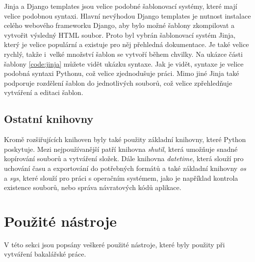 \documentclass[thesis=B,czech]{resources/FITthesis}[2012/06/26]
\begin{document}
Jinja a Django templates jsou velice podobné šablonovací systémy, které mají velice podobnou syntaxi. Hlavní nevýhodou Django templates je nutnost instalace celého webového frameworku Django, aby bylo možné šablony zkompilovat a vytvořit výsledný HTML soubor. Proto byl vybrán šablonovací systém Jinja, který je velice populární a existuje pro něj přehledná dokumentace. Je také velice rychlý, takže i~velké množství šablon se vytvoří během chvilky. Na ukázce části šablony \ref{code:jinja} můžete vidět ukázku syntaxe. Jak je vidět, syntaxe je velice podobná syntaxi Pythonu, což velice zjednodušuje práci. Mimo jiné Jinja také podporuje rozdělení šablon do jednotlivých souborů, což velice zpřehledňuje vytváření a editaci šablon.

\subsection{Ostatní knihovny}
Kromě rozšiřujících knihoven byly také použity základní knihovny, které Python poskytuje. Mezi nejpoužívanější patří knihovna \textit{shutil}, která umožňuje snadné kopírování souborů a vytváření složek. Dále knihovna \textit{datetime}, která slouží pro uchování času a exportování do potřebných formátů a také základní knihovny \textit{os} a \textit{sys}, které slouží pro práci s operačním systémem, jako je například kontrola existence souborů, nebo správa návratových kódů aplikace.



\section{Použité nástroje}
V této sekci jsou popsány veškeré použité nástroje, které byly použity při vytváření bakalářské práce.
\end{document}
